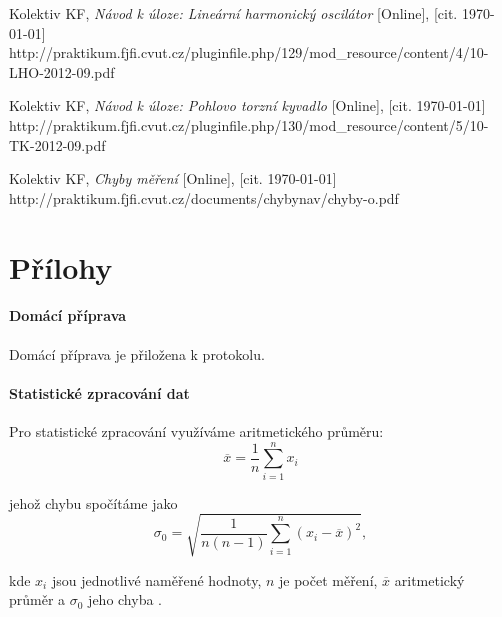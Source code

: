 \documentclass[english]{article}
\begin{document}
\begin{thebibliography}{9}
 Kolektiv KF, \emph{Návod k úloze: Lineární harmonický oscilátor} [Online], [cit. \today] \newline 
http://praktikum.fjfi.cvut.cz/pluginfile.php/129/mod\_resource/content/4/10-LHO-2012-09.pdf

 Kolektiv KF, \emph{Návod k úloze: Pohlovo torzní kyvadlo} [Online], [cit. \today] \newline 
http://praktikum.fjfi.cvut.cz/pluginfile.php/130/mod\_resource/content/5/10-TK-2012-09.pdf


 Kolektiv KF, \emph{Chyby měření} [Online], [cit. \today] \newline http://praktikum.fjfi.cvut.cz/documents/chybynav/chyby-o.pdf

\end{thebibliography}
\endgroup


\part{Přílohy}

\subsection{Domácí příprava}
	Domácí příprava je přiložena k protokolu.
\subsection{Statistické zpracování dat}
	Pro statistické zpracování využíváme aritmetického průměru:
	\begin{equation} \label{eq:aritmeticky_prumer}
	\overline{x} = \frac{1}{n}\sum\limits_{i=1}^{n}x_i
	\end{equation}
	
	jehož chybu spočítáme jako 
	\begin{equation} \label{eq:chyba_aritmetickeho_prumeru}
	\sigma_0 = \sqrt{\frac{1}{n(n-1)} \sum\limits_{i=1}^{n}\left( x_i - \overline{x} \right)^2 },
	\end{equation}
	
	kde $ x_i $ jsou jednotlivé naměřené hodnoty, $ n $ je počet měření, $ \overline{x} $ aritmetický průměr a $ \sigma_0 $ jeho chyba \cite{bib:chyby}.
	
\end{document}
